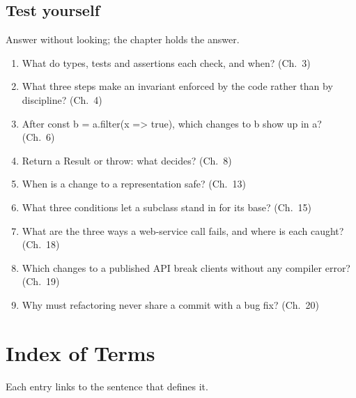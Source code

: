 \documentclass[10pt]{article}
\newcommand{\code}[1]{{\ttfamily\small #1}}
\begin{document}
\subsection{Test yourself}
Answer without looking; the chapter holds the answer.
\begin{enumerate}
  \item What do types, tests and assertions each check, and when? (Ch.~3)
  \item What three steps make an invariant enforced by the code rather than by discipline? (Ch.~4)
  \item After \code{const b = a.filter(x => true)}, which changes to \code{b} show up in \code{a}? (Ch.~6)
  \item Return a \code{Result} or throw: what decides? (Ch.~8)
  \item When is a change to a representation safe? (Ch.~13)
  \item What three conditions let a subclass stand in for its base? (Ch.~15)
  \item What are the three ways a web-service call fails, and where is each caught? (Ch.~18)
  \item Which changes to a published API break clients without any compiler error? (Ch.~19)
  \item Why must refactoring never share a commit with a bug fix? (Ch.~20)
\end{enumerate}

\section*{Index of Terms}
Each entry links to the sentence that defines it.
\end{document}
